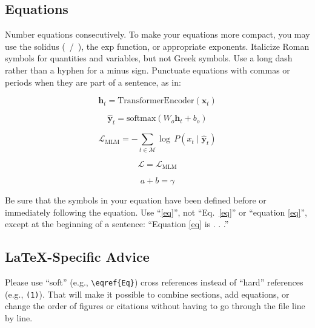 \documentclass[conference]{IEEEtran}
\begin{document}
\subsection{Equations}
Number equations consecutively. To make your 
equations more compact, you may use the solidus (~/~), the exp function, or 
appropriate exponents. Italicize Roman symbols for quantities and variables, 
but not Greek symbols. Use a long dash rather than a hyphen for a minus 
sign. Punctuate equations with commas or periods when they are part of a 
sentence, as in:

\begin{equation}
\mathbf{h}_t = \mathrm{TransformerEncoder}(\mathbf{x}_t)
\end{equation}

\begin{equation}
\hat{\mathbf{y}}_t = \mathrm{softmax}(W_o \mathbf{h}_t + b_o)
\end{equation}

\begin{equation}
\mathcal{L}_{\text{MLM}} = - \sum_{t \in \mathcal{M}}
\log \, P \left( x_t \mid \hat{\mathbf{y}}_t \right)
\end{equation}

\begin{equation}
\mathcal{L} = \mathcal{L}_{\text{MLM}}
\end{equation}


\begin{equation}
a+b=\gamma\label{eq}
\end{equation}

Be sure that the 
symbols in your equation have been defined before or immediately following 
the equation. Use ``\eqref{eq}'', not ``Eq.~\eqref{eq}'' or ``equation \eqref{eq}'', except at 
the beginning of a sentence: ``Equation \eqref{eq} is . . .''

\subsection{\LaTeX-Specific Advice}

Please use ``soft'' (e.g., \verb|\eqref{Eq}|) cross references instead
of ``hard'' references (e.g., \verb|(1)|). That will make it possible
to combine sections, add equations, or change the order of figures or
citations without having to go through the file line by line.
\end{document}
